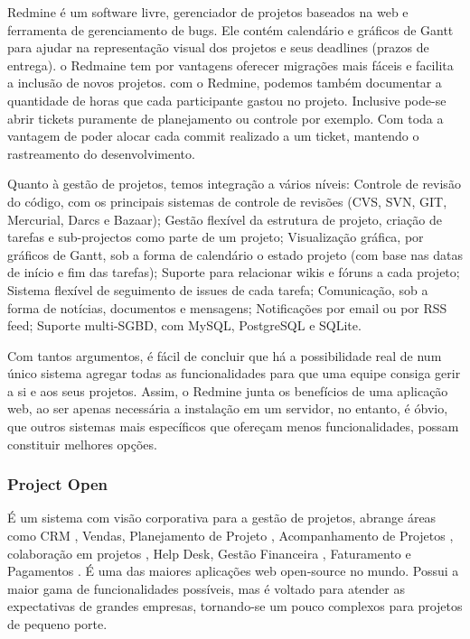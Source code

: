 \documentclass[12pt,a4paper]{article}
\begin{document}
			Redmine é um software livre, gerenciador de projetos baseados na web e ferramenta de gerenciamento de bugs. Ele contém calendário e gráficos de Gantt para ajudar na representação visual dos projetos e seus deadlines (prazos de entrega).  o Redmaine tem por vantagens oferecer migrações mais fáceis e facilita a inclusão de novos projetos. com o Redmine, podemos também documentar a quantidade de horas que cada participante gastou no projeto. Inclusive pode-se abrir tickets puramente de planejamento ou controle por exemplo. Com toda a vantagem de poder alocar cada commit realizado a um ticket, mantendo o rastreamento do desenvolvimento.
			
			Quanto à gestão de projetos, temos integração a vários níveis: Controle de revisão do código, com  os principais sistemas de controle de revisões (CVS, SVN, GIT, Mercurial, Darcs e Bazaar); Gestão flexível da estrutura de projeto, criação de tarefas e sub-projectos como parte de um projeto;
			Visualização gráfica, por gráficos de Gantt, sob a forma de calendário o estado projeto (com base nas datas de início e fim das tarefas); Suporte para relacionar wikis e fóruns a cada projeto; Sistema flexível de seguimento de issues de cada tarefa; Comunicação, sob a forma de notícias, documentos e mensagens; Notificações por email ou por RSS feed; Suporte multi-SGBD, com MySQL, PostgreSQL e SQLite.
			
			Com tantos argumentos, é fácil de concluir que há a possibilidade real  de num único sistema agregar todas as funcionalidades para que uma equipe consiga gerir a si e aos seus projetos. Assim, o Redmine junta os benefícios de uma aplicação  web, ao ser apenas necessária a instalação em um servidor, no entanto, é óbvio, que outros sistemas  mais específicos  que ofereçam  menos  funcionalidades, possam constituir melhores opções.
		
		\subsubsection{Project Open}
		
			É um sistema com visão corporativa para a gestão de projetos, abrange áreas como CRM , Vendas, Planejamento de Projeto , Acompanhamento de Projetos , colaboração em projetos ,  Help Desk, Gestão Financeira , Faturamento e Pagamentos . É uma das maiores aplicações web open-source no mundo. Possui a maior gama de funcionalidades possíveis, mas é voltado para atender as expectativas de grandes empresas, tornando-se um pouco complexos para projetos de pequeno porte.
		
\end{document}
